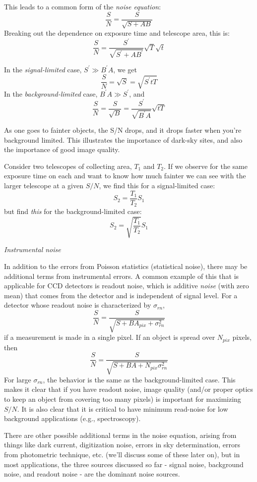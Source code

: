 \documentclass[12pt]{article}
\begin{document}
This leads to a common form of the \emph{noise equation}:
    $$ \frac{S}{N} = \frac{S}{\sqrt{S+AB}}  $$
Breaking out the dependence on exposure time and telescope area, this
is:
    $$ \frac{S}{N} = \frac{S^{\prime}}
    {\sqrt{S^{\prime}+AB^{\prime}}}
    \sqrt{T}\sqrt{t}$$

In the \emph{signal-limited} case, $S^{\prime}\gg B^{\prime}A$,
we get
$$ \frac{S}{N} = \sqrt{S} = \sqrt{S^{\prime}tT} $$
In the \emph{background-limited} case, $B^{\prime}A\gg S^{\prime}$,
and
$$ \frac{S}{N} = \frac{S}{\sqrt{B}} =
   \frac{S^{\prime}}{\sqrt{B^{\prime}A}}\sqrt{tT} $$

As one goes to fainter objects, the S/N drops, and it drops faster
when you're background limited. This illustrates the importance of
dark-sky sites, and also the importance of good image quality.

Consider two telescopes of collecting area, $T_1$ and $T_2$.
If we observe for the same exposure time on each and want to know how
much fainter we can see with the larger telescope at a given $S/N$, we
find this for a signal-limited case:
$$ S_2 = \frac{T_1}{T_2}S_1 $$
but find \emph{this} for the background-limited case:
$$ S_2 = \sqrt{\frac{T_1}{T_2}}S_1  $$

\emph{Instrumental noise}

In addition to the errors from Poisson statistics (statistical noise),
there may be additional terms from instrumental errors. A common
example of this that is applicable for CCD detectors is readout noise,
which is additive \emph{noise} (with zero mean) that comes from the detector
and is independent of signal level. For a detector whose readout noise
is characterized by $\sigma_{rn}$,
$$ \frac{S}{N} = \frac{S}{\sqrt{S+BA_{pix}+\sigma^2_{rn}}} $$
if a measurement is made in a single pixel. If an object is spread
over $N_{pix}$ pixels, then
$$ \frac{S}{N} = \frac{S}{\sqrt{S+BA+N_{pix}\sigma^2_{rn}}} $$
For large $\sigma_{rn}$, the behavior is the same as the
background-limited case. This makes it clear that if you have readout
noise, image quality (and/or proper optics to keep an object from
covering too many pixels) is important for maximizing $S/N$. It is
also clear that it is critical to have minimum read-noise for low
background applications (e.g., spectroscopy).

There are other possible additional terms in the noise equation,
arising from things like dark current, digitization noise, errors in
sky determination, errors from photometric technique, etc. (we'll
discuss some of these later on), but in most applications, the three
sources discussed so far - signal noise, background noise, and readout
noise - are the dominant noise sources.
\end{document}
